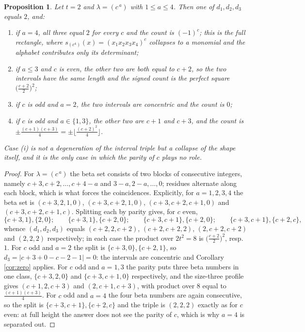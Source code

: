 \documentclass[11pt,reqno]{amsart}
\theoremstyle{plain}
\newtheorem{proposition}[theorem]{Proposition}
\theoremstyle{definition}
\begin{document}
\begin{proposition}\label{prop:rect}
Let $t=2$ and $\lambda=(c^{\,a})$ with $1\le a\le4$. Then one of $d_1,d_2,d_3$ equals $2$, and:
\begin{enumerate}
\item[\rm(i)] if $a=4$, all three equal $2$ for \emph{every} $c$ and the count is $(-1)^c$; this is
the full rectangle, where $s_{(c^4)}(x)=(x_1x_2x_3x_4)^{c}$ collapses to a monomial and the alphabet
contributes only its determinant;
\item[\rm(ii)] if $a\le3$ and $c$ is even, the other two are both equal to $c+2$, so the two
intervals have the \emph{same length} and the signed count is the perfect square
$\bigl(\tfrac{c+2}{2}\bigr)^2$;
\item[\rm(iii)] if $c$ is odd and $a=2$, the two intervals are \emph{concentric} and the count is $0$;
\item[\rm(iv)] if $c$ is odd and $a\in\{1,3\}$, the other two are $c+1$ and $c+3$, and the count is
$\pm\tfrac{(c+1)(c+3)}{4}=\pm\bigl\lfloor\tfrac{(c+2)^2}{4}\bigr\rfloor$.
\end{enumerate}
Case {\rm(i)} is not a degeneration of the interval triple but a collapse of the shape itself, and it
is the only case in which the parity of $c$ plays no role.
\end{proposition}

\begin{proof}
For $\lambda=(c^{\,a})$ the beta set consists of two blocks of consecutive integers, namely
$c+3,c+2,\dots,c+4-a$ and $3-a,2-a,\dots,0$; residues alternate along each block, which is what
forces the coincidences. Explicitly, for $a=1,2,3,4$ the beta set is $(c+3,2,1,0)$, $(c+3,c+2,1,0)$,
$(c+3,c+2,c+1,0)$ and $(c+3,c+2,c+1,c)$. Splitting each by parity gives, for $c$ even,
\[
\{c{+}3,1\},\{2,0\};\qquad \{c{+}3,1\},\{c{+}2,0\};\qquad \{c{+}3,c{+}1\},\{c{+}2,0\};\qquad
\{c{+}3,c{+}1\},\{c{+}2,c\},
\]
whence $(d_1,d_2,d_3)$ equals $(c{+}2,2,c{+}2)$, $(c{+}2,c{+}2,2)$, $(2,c{+}2,c{+}2)$ and
$(2,2,2)$ respectively; in each case the product over $2t^2=8$ is $\bigl(\tfrac{c+2}{2}\bigr)^2$,
resp. $1$. For $c$ odd and $a=2$ the split is $\{c{+}3,0\},\{c{+}2,1\}$, so
$d_3=|c{+}3+0-c{-}2-1|=0$: the intervals are concentric and Corollary \ref{cor:zero} applies. For
$c$ odd and $a=1,3$ the parity puts three beta numbers in one class, $\{c{+}3,2,0\}$ and
$\{c{+}3,c{+}1,0\}$ respectively, and the size-three profile gives $(c{+}1,2,c{+}3)$ and
$(2,c{+}1,c{+}3)$, with product over $8$ equal to $\tfrac{(c+1)(c+3)}{4}$. For $c$ odd and $a=4$ the
four beta numbers are again consecutive, so the split is $\{c{+}3,c{+}1\},\{c{+}2,c\}$ and the triple
is $(2,2,2)$ exactly as for $c$ even: at full height the answer does not see the parity of $c$, which
is why $a=4$ is separated out.
\end{proof}
\end{document}
